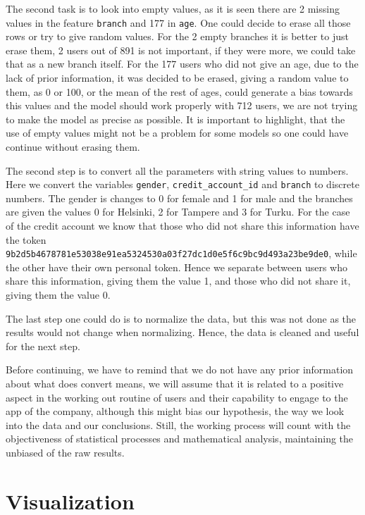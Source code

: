 \documentclass{article}
\begin{document}
The second task is to look into empty values, as it is seen there are 2 missing values in the feature \texttt{branch} and 177 in \texttt{age}. One could decide to erase all those rows or try to give random values. For the 2 empty branches it is better to just erase them, 2 users out of 891 is not important, if they were more, we could take that as a new branch itself. For the 177 users who did not give an age, due to the lack of prior information, it was decided to be erased, giving a random value to them, as 0 or 100, or the mean of the rest of ages, could generate a bias towards this values and the model should work properly with 712 users, we are not trying to make the model as precise as possible. It is important to highlight, that the use of empty values might not be a problem for some models so one could have continue without erasing them.

The second step is to convert all the parameters with string values to numbers. Here we convert the variables \texttt{gender}, \texttt{credit\_account\_id} and \texttt{branch} to discrete numbers. The gender is changes to 0 for female and 1 for male and the branches are given the values 0 for Helsinki, 2 for Tampere and 3 for Turku. For the case of the credit account we know that those who did not share this information have the token \texttt{9b2d5b4678781e53038e91ea5324530a03f27dc1d0e5f6c9bc9d493a23be9de0}, while the other have their own personal token. Hence we separate between users who share this information, giving them the value 1, and those who did not share it, giving them the value 0.

The last step one could do is to normalize the data, but this was not done as the results would not change when normalizing. Hence, the data is cleaned and useful for the next step.

Before continuing, we have to remind that we do not have any prior information about what does convert means, we will assume that it is related to a positive aspect in the working out routine of users and their capability to engage to the app of the company, although this might bias our hypothesis, the way we look into the data and our conclusions. Still, the working process will count with the objectiveness of statistical processes and mathematical analysis, maintaining the unbiased of the raw results.


\section{Visualization}
\end{document}
